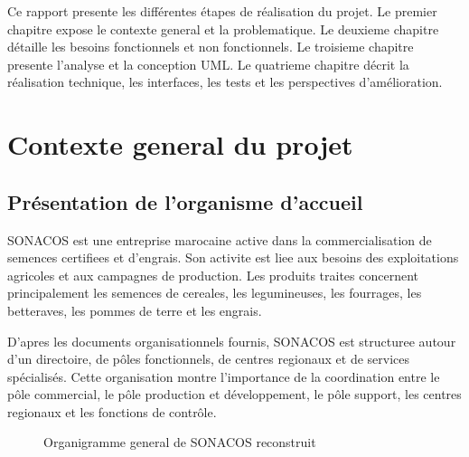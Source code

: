 \documentclass[12pt,a4paper]{report}
\begin{document}
Ce rapport presente les différentes étapes de réalisation du projet. Le premier chapitre expose le contexte general et la problematique. Le deuxieme chapitre détaille les besoins fonctionnels et non fonctionnels. Le troisieme chapitre presente l'analyse et la conception UML. Le quatrieme chapitre décrit la réalisation technique, les interfaces, les tests et les perspectives d'amélioration.

\chapter{Contexte general du projet}

\section{Présentation de l'organisme d'accueil}

SONACOS est une entreprise marocaine active dans la commercialisation de semences certifiees et d'engrais. Son activite est liee aux besoins des exploitations agricoles et aux campagnes de production. Les produits traites concernent principalement les semences de cereales, les legumineuses, les fourrages, les betteraves, les pommes de terre et les engrais.

D'apres les documents organisationnels fournis, SONACOS est structuree autour d'un directoire, de pôles fonctionnels, de centres regionaux et de services spécialisés. Cette organisation montre l'importance de la coordination entre le pôle commercial, le pôle production et développement, le pôle support, les centres regionaux et les fonctions de contrôle.

\begin{figure}[H]
  \centering
  \caption{Organigramme general de SONACOS reconstruit}
  \label{fig:organigramme-general}
\end{figure}
\end{document}
